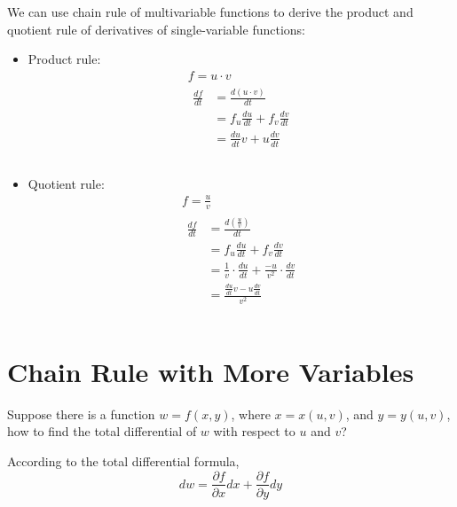 \documentclass{article}
\begin{document}
We can use chain rule of multivariable functions to derive the product and 
quotient rule of derivatives of single-variable functions:
\begin{itemize}
  \item Product rule:
    \begin{gather*}
      f = u \cdot v \\
      \begin{split}
        \frac{df}{dt} &= \frac{d(u \cdot v)}{dt} \\
                      &= f_u \frac{du}{dt} + f_v \frac{dv}{dt} \\
                      &= \frac{du}{dt} v + u \frac{dv}{dt} \\
      \end{split} \\
    \end{gather*}
  \item Quotient rule:
    \begin{gather*}
      f = \frac{u}{v} \\
      \begin{split}
        \frac{df}{dt} &= \frac{d(\frac{u}{v})}{dt} \\
                      &= f_u \frac{du}{dt} + f_v \frac{dv}{dt} \\
                      &= \frac{1}{v} \cdot \frac{du}{dt} + \frac{-u}{v^2} \cdot \frac{dv}{dt} \\
                      &= \frac{\frac{du}{dt}v - u\frac{dv}{dt}}{v^2} \\
      \end{split} \\
    \end{gather*}
\end{itemize}

\section{Chain Rule with More Variables}

Suppose there is a function $w = f(x, y)$, where $x = x(u, v)$, and 
$y = y(u, v)$, how to find the total differential of $w$ with respect to $u$ and 
$v$?

According to the total differential formula,
\begin{equation*}
  dw = \frac{\partial f}{\partial x}dx + \frac{\partial f}{\partial y}dy
\end{equation*}
\end{document}
